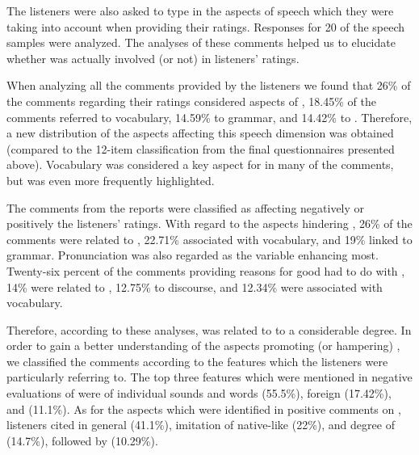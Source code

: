 \documentclass[output=paper]{langsci/langscibook}
\begin{document}
The listeners were also asked to type in the aspects of speech which they were taking into account when providing their  ratings. Responses for 20 of the speech samples were analyzed. The analyses of these comments helped us to elucidate whether  was actually involved (or not) in listeners'  ratings. 

When analyzing all the comments provided by the listeners we found that 26\% of the comments regarding their  ratings considered aspects of , 18.45\% of the comments referred to vocabulary, 14.59\% to grammar, and 14.42\% to . Therefore, a new distribution of the aspects affecting this speech dimension was obtained (compared to the 12-item classification from the final questionnaires presented above). Vocabulary was considered a key aspect for  in many of the comments, but  was even more frequently highlighted. 

The comments from the reports were classified as affecting negatively or positively the listeners’ ratings. With regard to the aspects hindering , 26\% of the comments were related to , 22.71\% associated with vocabulary, and 19\% linked to grammar. Pronunciation was also regarded as the variable enhancing  most. Twenty-six percent of the comments providing reasons for good  had to do with , 14\% were related to , 12.75\% to discourse, and 12.34\% were associated with vocabulary. 

Therefore, according to these analyses,  was related to  to a considerable degree. In order to gain a better understanding of the  aspects promoting (or hampering) , we classified the comments according to the  features which the listeners were particularly referring to. The top three  features which were mentioned in negative evaluations of  were  of individual sounds and words (55.5\%), foreign  (17.42\%), and  (11.1\%). As for the  aspects which were identified in positive comments on , listeners cited  in general (41.1\%), imitation of native-like  (22\%), and degree of  (14.7\%), followed by  (10.29\%).
\end{document}
